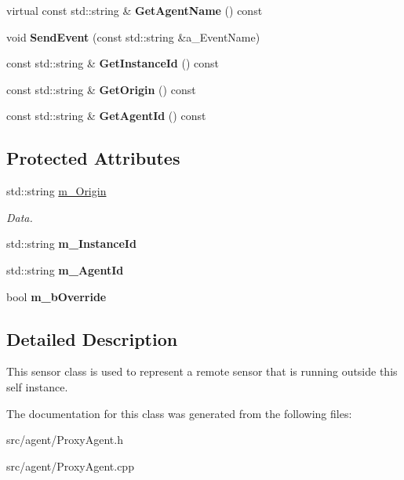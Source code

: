 \begin{DoxyCompactItemize}
virtual const std\+::string \& {\bfseries Get\+Agent\+Name} () const
\item 
\mbox{\label{class_proxy_agent_a5819530f52afa6b2d67894ce440f9b63}} 
void {\bfseries Send\+Event} (const std\+::string \&a\+\_\+\+Event\+Name)
\item 
\mbox{\label{class_proxy_agent_a7c35928b0c30c9294b3fbf624ee22dac}} 
const std\+::string \& {\bfseries Get\+Instance\+Id} () const
\item 
\mbox{\label{class_proxy_agent_a054f00082d3216c9dc067f3b42703351}} 
const std\+::string \& {\bfseries Get\+Origin} () const
\item 
\mbox{\label{class_proxy_agent_a1c95e8ecfe8686bd6cf3ade42049a715}} 
const std\+::string \& {\bfseries Get\+Agent\+Id} () const
\end{DoxyCompactItemize}
\subsection*{Protected Attributes}
\begin{DoxyCompactItemize}
\item 
\mbox{\label{class_proxy_agent_a7d293f78f766d884961ffa8ca1bf5c3a}} 
std\+::string \hyperlink{class_proxy_agent_a7d293f78f766d884961ffa8ca1bf5c3a}{m\+\_\+\+Origin}
\begin{DoxyCompactList}\small\item\em Data. \end{DoxyCompactList}\item 
\mbox{\label{class_proxy_agent_aae4f40ae46ad2823ae456fa48ad492ea}} 
std\+::string {\bfseries m\+\_\+\+Instance\+Id}
\item 
\mbox{\label{class_proxy_agent_a9a53b6a5e22ab5db13e90176576bfdf3}} 
std\+::string {\bfseries m\+\_\+\+Agent\+Id}
\item 
\mbox{\label{class_proxy_agent_a95d89beffeb4bdcb9fa78029e111e02e}} 
bool {\bfseries m\+\_\+b\+Override}
\end{DoxyCompactItemize}


\subsection{Detailed Description}
This sensor class is used to represent a remote sensor that is running outside this self instance. 

The documentation for this class was generated from the following files\+:\begin{DoxyCompactItemize}
\item 
src/agent/Proxy\+Agent.\+h\item 
src/agent/Proxy\+Agent.\+cpp\end{DoxyCompactItemize}
